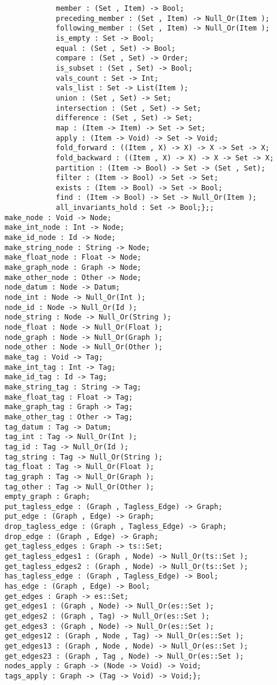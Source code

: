 \begin{verbatim}
                member : (Set , Item) -> Bool;
                preceding_member : (Set , Item) -> Null_Or(Item );
                following_member : (Set , Item) -> Null_Or(Item );
                is_empty : Set -> Bool;
                equal : (Set , Set) -> Bool;
                compare : (Set , Set) -> Order;
                is_subset : (Set , Set) -> Bool;
                vals_count : Set -> Int;
                vals_list : Set -> List(Item );
                union : (Set , Set) -> Set;
                intersection : (Set , Set) -> Set;
                difference : (Set , Set) -> Set;
                map : (Item -> Item) -> Set -> Set;
                apply : (Item -> Void) -> Set -> Void;
                fold_forward : ((Item , X) -> X) -> X -> Set -> X;
                fold_backward : ((Item , X) -> X) -> X -> Set -> X;
                partition : (Item -> Bool) -> Set -> (Set , Set);
                filter : (Item -> Bool) -> Set -> Set;
                exists : (Item -> Bool) -> Set -> Bool;
                find : (Item -> Bool) -> Set -> Null_Or(Item );
                all_invariants_hold : Set -> Bool;};;
    make_node : Void -> Node;
    make_int_node : Int -> Node;
    make_id_node : Id -> Node;
    make_string_node : String -> Node;
    make_float_node : Float -> Node;
    make_graph_node : Graph -> Node;
    make_other_node : Other -> Node;
    node_datum : Node -> Datum;
    node_int : Node -> Null_Or(Int );
    node_id : Node -> Null_Or(Id );
    node_string : Node -> Null_Or(String );
    node_float : Node -> Null_Or(Float );
    node_graph : Node -> Null_Or(Graph );
    node_other : Node -> Null_Or(Other );
    make_tag : Void -> Tag;
    make_int_tag : Int -> Tag;
    make_id_tag : Id -> Tag;
    make_string_tag : String -> Tag;
    make_float_tag : Float -> Tag;
    make_graph_tag : Graph -> Tag;
    make_other_tag : Other -> Tag;
    tag_datum : Tag -> Datum;
    tag_int : Tag -> Null_Or(Int );
    tag_id : Tag -> Null_Or(Id );
    tag_string : Tag -> Null_Or(String );
    tag_float : Tag -> Null_Or(Float );
    tag_graph : Tag -> Null_Or(Graph );
    tag_other : Tag -> Null_Or(Other );
    empty_graph : Graph;
    put_tagless_edge : (Graph , Tagless_Edge) -> Graph;
    put_edge : (Graph , Edge) -> Graph;
    drop_tagless_edge : (Graph , Tagless_Edge) -> Graph;
    drop_edge : (Graph , Edge) -> Graph;
    get_tagless_edges : Graph -> ts::Set;
    get_tagless_edges1 : (Graph , Node) -> Null_Or(ts::Set );
    get_tagless_edges2 : (Graph , Node) -> Null_Or(ts::Set );
    has_tagless_edge : (Graph , Tagless_Edge) -> Bool;
    has_edge : (Graph , Edge) -> Bool;
    get_edges : Graph -> es::Set;
    get_edges1 : (Graph , Node) -> Null_Or(es::Set );
    get_edges2 : (Graph , Tag) -> Null_Or(es::Set );
    get_edges3 : (Graph , Node) -> Null_Or(es::Set );
    get_edges12 : (Graph , Node , Tag) -> Null_Or(es::Set );
    get_edges13 : (Graph , Node , Node) -> Null_Or(es::Set );
    get_edges23 : (Graph , Tag , Node) -> Null_Or(es::Set );
    nodes_apply : Graph -> (Node -> Void) -> Void;
    tags_apply : Graph -> (Tag -> Void) -> Void;};
\end{verbatim}
